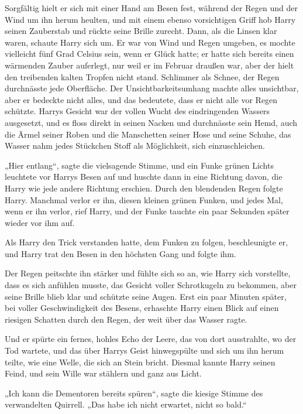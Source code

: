 {Sorgfältig hielt er sich mit einer Hand am Besen fest, während der Regen und der Wind um ihn herum heulten, und mit einem ebenso vorsichtigen Griff hob Harry seinen Zauberstab und rückte seine Brille zurecht. Dann, als die Linsen klar waren, schaute Harry sich um. Er war von Wind und Regen umgeben, es mochte vielleicht fünf Grad Celsius sein, wenn er Glück hatte; er hatte sich bereits einen wärmenden Zauber auferlegt, nur weil er im Februar draußen war, aber der hielt den treibenden kalten Tropfen nicht stand. Schlimmer als Schnee, der Regen durchnässte jede Oberfläche. Der Unsichtbarkeitsumhang machte alles unsichtbar, aber er bedeckte nicht alles, und das bedeutete, dass er nicht alle vor Regen schützte. Harrys Gesicht war der vollen Wucht des eindringenden Wassers ausgesetzt, und es floss direkt in seinen Nacken und durchnässte sein Hemd, auch die Ärmel seiner Roben und die Manschetten seiner Hose und seine Schuhe, das Wasser nahm jedes Stückchen Stoff als Möglichkeit, sich einzuschleichen.

„Hier entlang“, sagte die vielsagende Stimme, und ein Funke grünen Lichts leuchtete vor Harrys Besen auf und huschte dann in eine Richtung davon, die Harry wie jede andere Richtung erschien. Durch den blendenden Regen folgte Harry. Manchmal verlor er ihn, diesen kleinen grünen Funken, und jedes Mal, wenn er ihn verlor, rief Harry, und der Funke tauchte ein paar Sekunden später wieder vor ihm auf.

Als Harry den Trick verstanden hatte, dem Funken zu folgen, beschleunigte er, und Harry trat den Besen in den höchsten Gang und folgte ihm.

Der Regen peitschte ihn stärker und fühlte sich so an, wie Harry sich vorstellte, dass es sich anfühlen musste, das Gesicht voller Schrotkugeln zu bekommen, aber seine Brille blieb klar und schützte seine Augen. Erst ein paar Minuten später, bei voller Geschwindigkeit des Besens, erhaschte Harry einen Blick auf einen riesigen Schatten durch den Regen, der weit über das Wasser ragte.

Und er spürte ein fernes, hohles Echo der Leere, das von dort ausstrahlte, wo der Tod wartete, und das über Harrys Geist hinwegspülte und sich um ihn herum teilte, wie eine Welle, die sich an Stein bricht. Diesmal kannte Harry seinen Feind, und sein Wille war stählern und ganz aus Licht.

„Ich kann die Dementoren bereits spüren“, sagte die kiesige Stimme des verwandelten Quirrell. „Das habe ich nicht erwartet, nicht so bald.“

}
